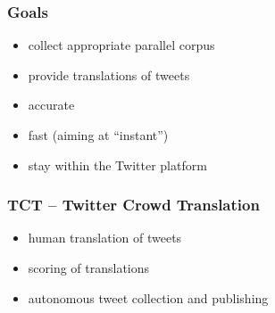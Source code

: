 \documentclass[12pt]{beamer}
\begin{document}
\begin{frame}
	\frametitle{Goals}
	\begin{itemize}
		\item \textcolor{TCTsilver}{\Large collect appropriate parallel corpus}
		\item \textcolor{TCTsilver}{provide translations of tweets}
		\item \textcolor{TCTsilver}{accurate}
		\item \textcolor{TCTsilver}{fast (aiming at ``instant'')}
		\item \textcolor{TCTsilver}{stay within the Twitter platform}
	\end{itemize}
\end{frame}

\begin{frame}
	\frametitle{TCT -- Twitter Crowd Translation}
	\begin{itemize}
		\item \textcolor{TCTsilver}{human translation of tweets}
		\item \textcolor{TCTsilver}{scoring of translations}
		\item \textcolor{TCTsilver}{autonomous tweet collection and publishing}
	\end{itemize}
\end{frame}

\end{document}
